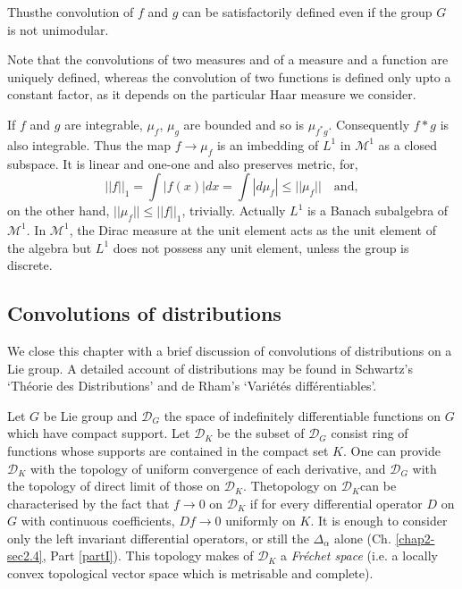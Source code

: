 Thus\pageoriginale the convolution of $f$ and $g$ can be
satisfactorily defined even 
if the group $G$ is not unimodular. 


Note that the convolutions of two measures and of a measure and a
function are uniquely defined, whereas the convolution of two
functions is defined  only upto a constant factor, as it depends on
the particular Haar measure we consider. 


If $f$ and $g$ are integrable, $\mu_{f}$, $\mu_{g}$ are bounded and so is
$\mu _{f^*g}$.  
Consequently $f*g$ is also integrable. Thus the map $f\rightarrow
\mu_{f}$ is an imbedding of $L^1$ in $\mathscr{M}^1$ as a closed
subspace. It is linear and one-one and also preserves metric, for, 
$$
|| f ||_{1}  = \int| f(x)|  dx= \int| d \mu_f |\leq||\mu_f||\quad \text{and},
$$
on the other hand, $|| \mu_{f}||  \leq || f ||_{1}$,
trivially. Actually $L^1$ 
is a Banach subalgebra of $\mathscr{M}^1$. In $\mathscr{M}^1$, the
Dirac measure at the unit element acts 
as the unit element of the algebra but $L^1$ does not possess any unit
element, unless the group is discrete. 

\subsection{Convolutions of
  distributions}\label{partII-chap3-sec3.7}%

We close this chapter with a brief discussion of convolutions of
distributions on a Lie group. 
A detailed account of distributions may be found in Schwartz's
`Th\'eorie des Distributions' and de Rham's  
`Vari\'et\'es diff\'erentiables'.

Let $G$ be Lie group and $\mathcal{D}_G$ the space of indefinitely
differentiable functions on $G$ which have compact support. Let
$\mathcal{D}_K$ be the subset of $\mathcal{D}_G$ consist ring of
functions whose supports are contained in the compact set $K$. One can
provide $\mathcal{D}_{K}$ with the topology of uniform convergence of
each derivative, and $\mathcal{D}_{G}$ with the topology of direct
limit of those on $\mathcal{D}_{K}$. 
 The\pageoriginale topology on $\mathcal{D}_{K}$can be characterised
 by the fact that
$f \rightarrow 0$ on $\mathcal{D}_K$ if for every differential operator
$D$ on  $G$ with  continuous coefficients, $Df\rightarrow 0$
uniformly on $K$. It is enough to consider only the left invariant
differential operators, or still the $\Delta_{\alpha}$ alone
(Ch. \ref{chap2-sec2.4}, Part \ref{partI}). This topology makes of
$\mathcal{D}_{K}$ a \textit{Fr\'echet space}  
(i.e. a locally convex  topological vector space which is metrisable
and complete). 


